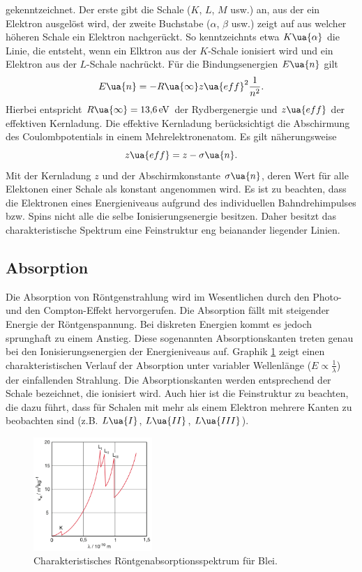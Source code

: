 gekenntzeichnet. Der erste gibt die Schale ($K$, $L$, $M$ usw.) an, aus der ein Elektron ausgelöst wird, der zweite Buchstabe
($\alpha$, $\beta$ usw.) zeigt auf aus welcher höheren Schale ein Elektron nachgerückt. So kenntzeichnts etwa
$K\ua{\alpha}$ die Linie, die entsteht, wenn ein Elktron aus der $K$-Schale ionisiert wird und ein Elektron aus der $L$-Schale
nachrückt. Für die Bindungsenergien $E\ua{n}$ gilt
\begin{equation}
  E\ua{n} = -R\ua{\infty} z\ua{eff}^2 \frac{1}{n^2}.
\end{equation}
Hierbei entspricht $R\ua{\infty} = \SI{13.6}{\eV}$ der Rydbergenergie und $z\ua{eff}$ der effektiven Kernladung. Die effektive
Kernladung berücksichtigt die Abschirmung des Coulombpotentials in einem Mehrelektronenatom. Es gilt näherungsweise
\begin{equation}
  z\ua{eff} = z - \sigma\ua{n}.
\end{equation}
Mit der Kernladung $z$ und der Abschirmkonstante $\sigma\ua{n}$, deren Wert für alle Elektonen einer Schale als konstant angenommen wird.
Es ist zu beachten, dass die Elektronen eines Energieniveaus
aufgrund des individuellen Bahndrehimpulses bzw. Spins nicht alle die selbe Ionisierungsenergie besitzen. Daher besitzt das charakteristische
Spektrum eine Feinstruktur eng beianander liegender Linien.

\subsection{Absorption}
Die Absorption von Röntgenstrahlung wird im Wesentlichen durch den Photo- und den Compton-Effekt hervorgerufen. Die Absorption
fällt mit steigender Energie der Röntgenspannung. Bei diskreten Energien kommt es jedoch sprunghaft zu einem Anstieg. Diese
sogenannten Absorptionskanten treten genau bei den Ionisierungsenergien der Energieniveaus auf. Graphik \ref{fig: absorption} zeigt einen charakteristischen
Verlauf der Absorption unter variabler Wellenlänge ($E \propto \frac{1}{\lambda}$) der einfallenden Strahlung.
Die Absorptionskanten werden entsprechend der Schale bezeichnet, die ionisiert wird.
Auch hier ist die Feinstruktur zu beachten, die dazu
führt, dass für Schalen mit mehr als einem Elektron mehrere Kanten zu beobachten sind (z.B. $L\ua{I}$, $L\ua{II}$, $L\ua{III}$).
\begin{figure}[H]
  \centering
  \includegraphics[width = 0.4\textwidth]{absorption.png}
  \caption{Charakteristisches Röntgenabsorptionsspektrum für Blei\cite{}.}
  \label{fig: absorption}
\end{figure}

